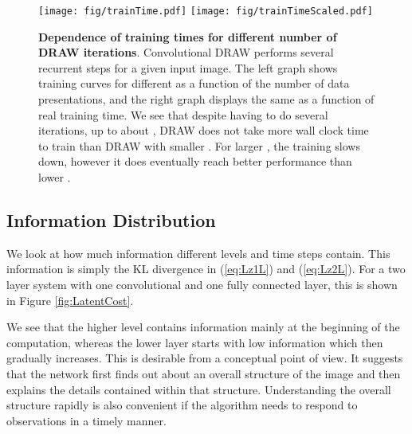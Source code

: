 \documentclass{article}
\begin{document}
\begin{figure}[t]
\begin{center}
\vspace{-0.2cm}
\begin{minipage}{0.5\textwidth}
\texttt{[image: fig/trainTime.pdf]}
\texttt{[image: fig/trainTimeScaled.pdf]}
\caption{\textbf{Dependence of training times for different number of DRAW iterations}. Convolutional DRAW performs several recurrent steps  for a given input image. The left graph shows training curves for different  as a function of the number of data presentations, and the right graph displays the same as a function of real training time. We see that despite having to do several iterations, up to about , DRAW does not take more wall clock time to train than DRAW with smaller . For larger , the training slows down, however it does eventually reach better performance than lower . }
\vspace{-0.7cm}
\label{fig:trainTime}
\end{minipage}
\end{center}
\end{figure}





\subsection{Information Distribution}

We look at how much information different levels and time steps contain. This information is simply the KL divergence in (\ref{eq:Lz1L}) and (\ref{eq:Lz2L}). For a two layer system with one convolutional and one fully connected layer, this is shown in Figure \ref{fig:LatentCost}.

We see that the higher level contains information mainly at the beginning of the computation, whereas the lower layer starts with low information which then gradually increases. This is desirable from a conceptual point of view. It suggests that the network first finds out about an overall structure of the image and then explains the details contained within that structure.
Understanding the overall structure rapidly is also convenient if the algorithm needs to respond to observations in a timely manner.
\end{document}
